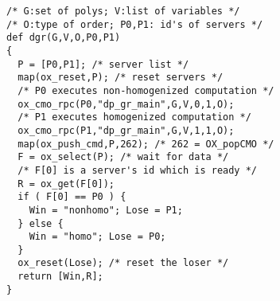 \begin{verbatim}
/* G:set of polys; V:list of variables */
/* O:type of order; P0,P1: id's of servers */
def dgr(G,V,O,P0,P1)
{
  P = [P0,P1]; /* server list */
  map(ox_reset,P); /* reset servers */
  /* P0 executes non-homogenized computation */
  ox_cmo_rpc(P0,"dp_gr_main",G,V,0,1,O);
  /* P1 executes homogenized computation */
  ox_cmo_rpc(P1,"dp_gr_main",G,V,1,1,O);
  map(ox_push_cmd,P,262); /* 262 = OX_popCMO */
  F = ox_select(P); /* wait for data */
  /* F[0] is a server's id which is ready */
  R = ox_get(F[0]);
  if ( F[0] == P0 ) {
    Win = "nonhomo"; Lose = P1;
  } else {
    Win = "homo"; Lose = P0;
  }
  ox_reset(Lose); /* reset the loser */
  return [Win,R];
}
\end{verbatim}
